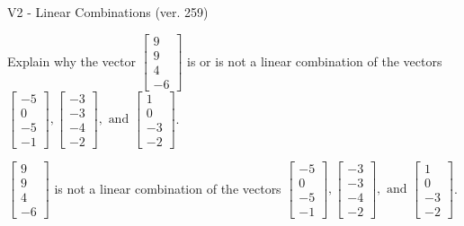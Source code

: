 \begin{exercise}
  \begin{exerciseTitle}V2 - Linear Combinations (ver. 259)\end{exerciseTitle}
  \begin{exerciseStatement}
    Explain why the vector \(\left[\begin{array}{c}
9 \\
9 \\
4 \\
-6
\end{array}\right]\)  is or is not a linear 
	combination of the vectors \(\left[\begin{array}{c}
-5 \\
0 \\
-5 \\
-1
\end{array}\right] , \left[\begin{array}{c}
-3 \\
-3 \\
-4 \\
-2
\end{array}\right] , \text{ and } \left[\begin{array}{c}
1 \\
0 \\
-3 \\
-2
\end{array}\right]\).
	


  \end{exerciseStatement}
  \begin{exerciseAnswer}
   \(\left[\begin{array}{c}
9 \\
9 \\
4 \\
-6
\end{array}\right]\) 
  	 is not  
	a linear combination of the vectors \(\left[\begin{array}{c}
-5 \\
0 \\
-5 \\
-1
\end{array}\right] , \left[\begin{array}{c}
-3 \\
-3 \\
-4 \\
-2
\end{array}\right] , \text{ and } \left[\begin{array}{c}
1 \\
0 \\
-3 \\
-2
\end{array}\right]\).

	
  


  \end{exerciseAnswer}
\end{exercise}